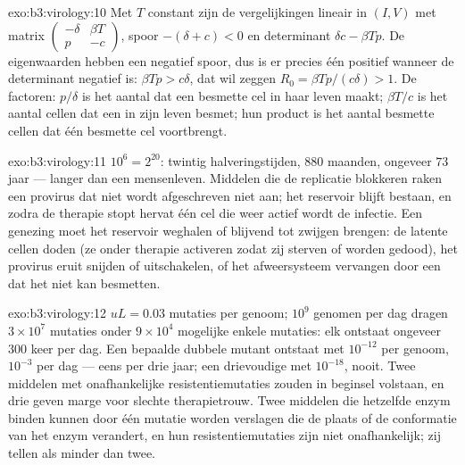 \begin{solution}{exo:b3:virology:10}
Met $T$ constant zijn de vergelijkingen lineair in $(I, V)$ met matrix
$\begin{pmatrix} -\delta & \beta T \\ p & -c \end{pmatrix}$, spoor
$-(\delta + c) < 0$ en determinant $\delta c - \beta Tp$. De
eigenwaarden hebben een negatief spoor, dus is er precies één positief
wanneer de determinant negatief is: $\beta Tp > c\delta$, dat wil
zeggen $R_{0} = \beta
Tp/(c\delta) > 1$. De factoren: $p/\delta$ is het aantal  dat
een besmette cel in haar leven maakt; $\beta T/c$ is het aantal cellen
dat een  in zijn leven besmet; hun product is het aantal besmette
cellen dat één besmette cel voortbrengt.
\end{solution}

\begin{solution}{exo:b3:virology:11}
$10^{6} = 2^{20}$: twintig halveringstijden, $880$ maanden, ongeveer
$73$ jaar --- langer dan een mensenleven. Middelen die de replicatie
blokkeren raken een provirus dat niet wordt afgeschreven niet aan; het
reservoir blijft bestaan, en zodra de therapie stopt hervat één cel die
weer actief wordt de infectie. Een genezing moet het reservoir
weghalen of blijvend tot zwijgen brengen: de latente cellen doden (ze
onder therapie activeren zodat zij sterven of worden gedood), het
provirus eruit snijden of uitschakelen, of het afweersysteem vervangen
door een dat het  niet kan besmetten.
\end{solution}

\begin{solution}{exo:b3:virology:12}
$uL = 0.03$ mutaties per genoom; $10^{9}$ genomen per dag dragen
$3\times
10^{7}$ mutaties onder $9\times 10^{4}$ mogelijke enkele mutaties: elk
ontstaat ongeveer $300$ keer per dag. Een bepaalde dubbele mutant
ontstaat met $10^{-12}$ per genoom, $10^{-3}$ per dag --- eens per drie
jaar; een drievoudige met $10^{-18}$, nooit. Twee middelen met
onafhankelijke resistentiemutaties zouden in beginsel volstaan, en drie
geven marge voor slechte therapietrouw. Twee middelen die hetzelfde
enzym binden kunnen door één mutatie worden verslagen die de plaats of
de conformatie van het enzym verandert, en hun resistentiemutaties zijn
niet onafhankelijk; zij tellen als minder dan twee.
\end{solution}

